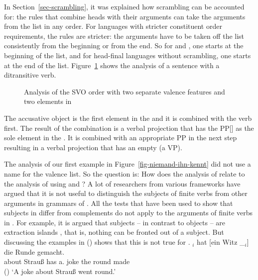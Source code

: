 In Section~\ref{sec-scrambling}, it was explained how scrambling can be accounted for: the rules that
combine heads with their arguments can take the arguments from the list in any order. For languages
with stricter constituent order requirements, the rules are stricter: the arguments have to be taken
off the list consistently from the beginning or from the end. So for  and , one starts
at the beginning of the list, and for head-final languages without scrambling, one starts at the end
of the list. Figure~\ref{fig-svo-ditrans} shows the analysis of a sentence with a ditransitive verb.
\begin{figure}
\caption{\label{fig-svo-ditrans}Analysis of the SVO order with two separate valence features and two
  elements in \comps}
\end{figure}
The accusative object is the first element in the \compsl and it is combined with the verb
first. The result of the combination is a verbal projection that has the PP[] as the sole
element in the \compsl. It is combined with an appropriate PP in the next step resulting in a verbal
projection that has an empty \compsl (a VP).


The analysis of our first  example in Figure~\ref{fig-niemand-ihn-kennt} did not use a name
for the valence list. So the question is: How does the analysis of  relate to the analysis of
 using \spr and \comps? A lot of researchers from various frameworks have argued that it is not
useful to distinguish the subjects of finite verbs from other arguments in grammars of . All the tests that have
been used to show that subjects in  differ from complements do not apply to the arguments of
finite verbs in . For example, it is argued that subjects – in contrast to objects – are
extraction islands \parencites[--250]{Chomsky73a}[]{Fanselow87a}[--36]{Grewendorf89a}, that is, nothing can be
fronted out of a subject. But \citet[]{Haider93a} discussing the examples in () shows that this is not true for
.
\eal
\ex 
{}$_i$ hat [ein        Witz \_$_i$] die Runde gemacht.\\
     \spacebr{}about Strauß      has \spacebr{}a.\NOM{} joke {}      the round made\\\hfill()
\glt `A joke about Strauß went round.'

